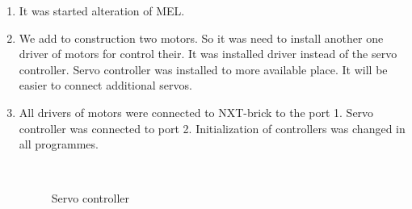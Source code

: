 \begin{enumerate}
\begin{enumerate}
		\item It was started alteration of MEL.
		
		\item We add to construction two motors. So it was need to install another one driver of motors for control their. It was installed driver instead of the servo controller. Servo controller was installed to more available place. It will be easier to connect additional servos.
		
		\item All drivers of motors were connected to NXT-brick to the port 1. Servo controller was connected to port 2. Initialization of controllers was changed in all programmes.
		
		\begin{figure}[H]
			\begin{minipage}[h]{0.2\linewidth}
				\center  
			\end{minipage}
			\begin{minipage}[h]{0.6\linewidth}
				\caption{Servo controller}
			\end{minipage}
		\end{figure}
		
	\end{enumerate}
	

\end{enumerate}
